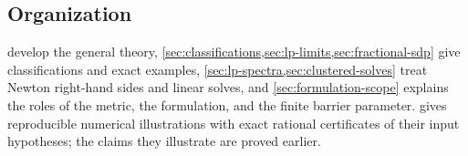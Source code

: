 \subsection{Organization}

 develop the general theory,
\cref{sec:classifications,sec:lp-limits,sec:fractional-sdp} give
classifications and exact examples,
\cref{sec:lp-spectra,sec:clustered-solves} treat Newton right-hand
sides and linear solves, and \cref{sec:formulation-scope} explains the
roles of the metric, the formulation, and the finite barrier parameter.
 gives reproducible numerical illustrations with
exact rational certificates of their input hypotheses; the claims they
illustrate are proved earlier.
